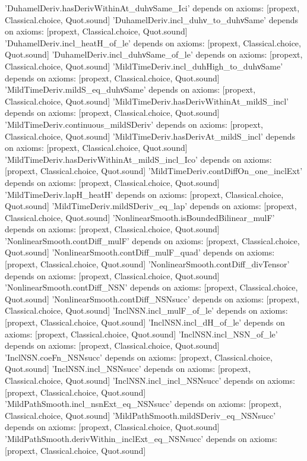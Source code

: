 \documentclass[11pt,a4paper]{article}
\theoremstyle{definition}
\theoremstyle{remark}
\begin{document}
\begin{leancode}
'DuhamelDeriv.hasDerivWithinAt_duhνSame_Ici' depends on axioms: [propext, Classical.choice, Quot.sound]
'DuhamelDeriv.incl_duhν_to_duhνSame' depends on axioms: [propext, Classical.choice, Quot.sound]
'DuhamelDeriv.incl_heatH_of_le' depends on axioms: [propext, Classical.choice, Quot.sound]
'DuhamelDeriv.incl_duhνSame_of_le' depends on axioms: [propext, Classical.choice, Quot.sound]
'MildTimeDeriv.incl_duhHigh_to_duhνSame' depends on axioms: [propext, Classical.choice, Quot.sound]
'MildTimeDeriv.mildS_eq_duhνSame' depends on axioms: [propext, Classical.choice, Quot.sound]
'MildTimeDeriv.hasDerivWithinAt_mildS_incl' depends on axioms: [propext, Classical.choice, Quot.sound]
'MildTimeDeriv.continuous_mildSDeriv' depends on axioms: [propext, Classical.choice, Quot.sound]
'MildTimeDeriv.hasDerivAt_mildS_incl' depends on axioms: [propext, Classical.choice, Quot.sound]
'MildTimeDeriv.hasDerivWithinAt_mildS_incl_Ico' depends on axioms: [propext, Classical.choice, Quot.sound]
'MildTimeDeriv.contDiffOn_one_inclExt' depends on axioms: [propext, Classical.choice, Quot.sound]
'MildTimeDeriv.lapH_heatH' depends on axioms: [propext, Classical.choice, Quot.sound]
'MildTimeDeriv.mildSDeriv_eq_lap' depends on axioms: [propext, Classical.choice, Quot.sound]
'NonlinearSmooth.isBoundedBilinear_mulF' depends on axioms: [propext, Classical.choice, Quot.sound]
'NonlinearSmooth.contDiff_mulF' depends on axioms: [propext, Classical.choice, Quot.sound]
'NonlinearSmooth.contDiff_mulF_quad' depends on axioms: [propext, Classical.choice, Quot.sound]
'NonlinearSmooth.contDiff_divTensor' depends on axioms: [propext, Classical.choice, Quot.sound]
'NonlinearSmooth.contDiff_NSN' depends on axioms: [propext, Classical.choice, Quot.sound]
'NonlinearSmooth.contDiff_NSNsucc' depends on axioms: [propext, Classical.choice, Quot.sound]
'InclNSN.incl_mulF_of_le' depends on axioms: [propext, Classical.choice, Quot.sound]
'InclNSN.incl_dH_of_le' depends on axioms: [propext, Classical.choice, Quot.sound]
'InclNSN.incl_NSN_of_le' depends on axioms: [propext, Classical.choice, Quot.sound]
'InclNSN.coeFn_NSNsucc' depends on axioms: [propext, Classical.choice, Quot.sound]
'InclNSN.incl_NSNsucc' depends on axioms: [propext, Classical.choice, Quot.sound]
'InclNSN.incl_incl_NSNsucc' depends on axioms: [propext, Classical.choice, Quot.sound]
'MildPathSmooth.incl_nsnExt_eq_NSNsucc' depends on axioms: [propext, Classical.choice, Quot.sound]
'MildPathSmooth.mildSDeriv_eq_NSNsucc' depends on axioms: [propext, Classical.choice, Quot.sound]
'MildPathSmooth.derivWithin_inclExt_eq_NSNsucc' depends on axioms: [propext, Classical.choice, Quot.sound]

\end{leancode}
\end{document}
